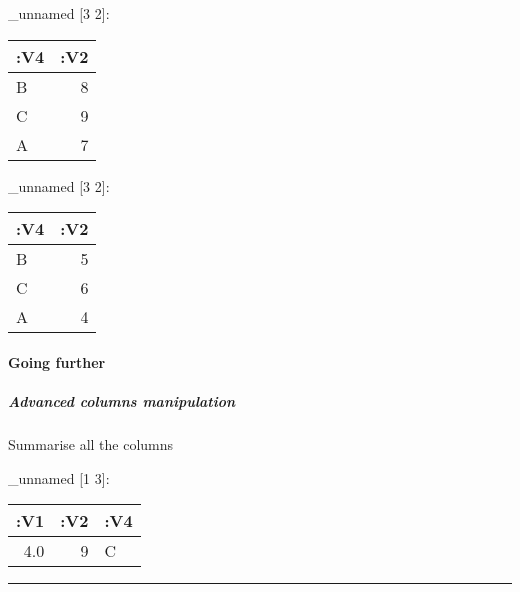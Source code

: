 \documentclass[]{article}
\newenvironment{Shaded}{\begin{snugshade}}{\end{snugshade}}
\newcommand{\KeywordTok}[1]{\textcolor[rgb]{0.13,0.29,0.53}{\textbf{#1}}}
\newcommand{\DecValTok}[1]{\textcolor[rgb]{0.00,0.00,0.81}{#1}}
\newcommand{\CommentTok}[1]{\textcolor[rgb]{0.56,0.35,0.01}{\textit{#1}}}
\newcommand{\VariableTok}[1]{\textcolor[rgb]{0.00,0.00,0.00}{#1}}
\newcommand{\AttributeTok}[1]{\textcolor[rgb]{0.77,0.63,0.00}{#1}}
\newcommand{\NormalTok}[1]{#1}
\let\oldparagraph\paragraph
\renewcommand{\paragraph}[1]{\oldparagraph{#1}\mbox{}}
\let\oldsubparagraph\subparagraph
\renewcommand{\subparagraph}[1]{\oldsubparagraph{#1}\mbox{}}
\begin{document}
\_unnamed {[}3 2{]}:

\begin{longtable}[]{@{}lr@{}}
\toprule
:V4 & :V2\tabularnewline
\midrule
\endhead
B & 8\tabularnewline
C & 9\tabularnewline
A & 7\tabularnewline
\bottomrule
\end{longtable}

\begin{Shaded}
\end{Shaded}

\_unnamed {[}3 2{]}:

\begin{longtable}[]{@{}lr@{}}
\toprule
:V4 & :V2\tabularnewline
\midrule
\endhead
B & 5\tabularnewline
C & 6\tabularnewline
A & 4\tabularnewline
\bottomrule
\end{longtable}

\paragraph{Going further}\label{going-further}

\subparagraph{Advanced columns
manipulation}\label{advanced-columns-manipulation}

Summarise all the columns

\begin{Shaded}
\end{Shaded}

\_unnamed {[}1 3{]}:

\begin{longtable}[]{@{}rrl@{}}
\toprule
:V1 & :V2 & :V4\tabularnewline
\midrule
\endhead
4.0 & 9 & C\tabularnewline
\bottomrule
\end{longtable}

\begin{center}\rule{0.5\linewidth}{0.5pt}\end{center}
\end{document}
